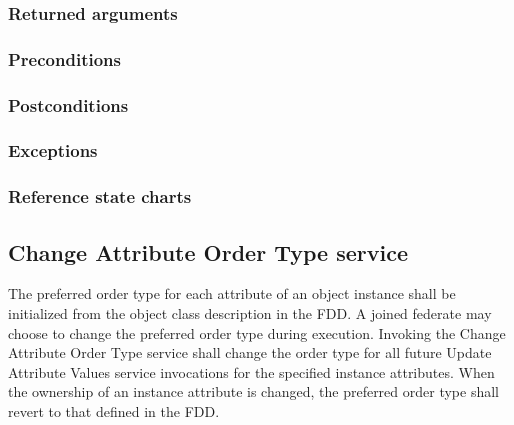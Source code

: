 \begin{compactstdpage}

    \subsubsection{Returned arguments}


    \subsubsection{Preconditions}


    \subsubsection{Postconditions}


    \subsubsection{Exceptions}


    \subsubsection{Reference state charts}


    \subsection{Change Attribute Order Type service}

    The preferred order type for each attribute of an object instance shall be initialized from the object class description in the FDD. A joined federate may choose to change the preferred order type during execution. Invoking the Change Attribute Order Type service shall change the order type for all future Update Attribute Values service invocations for the specified instance attributes. When the ownership of an instance attribute is changed, the preferred order type shall revert to that defined in the FDD.


\end{compactstdpage}
